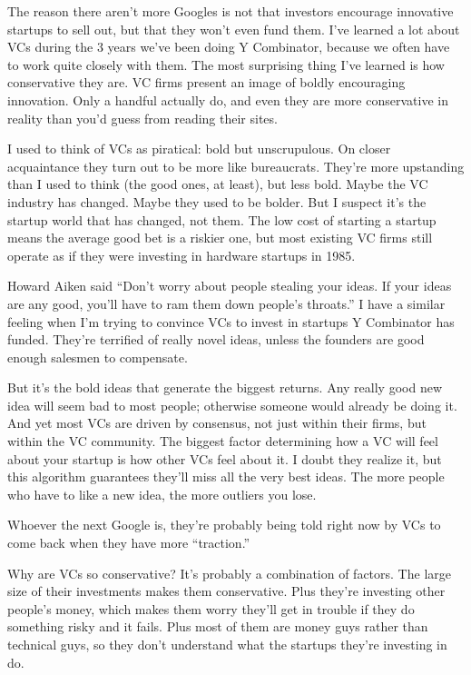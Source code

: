 The reason there aren't more Googles is not that investors encourage
innovative startups to sell out, but that they won't even fund them.
I've learned a lot about VCs during the 3 years we've been doing Y
Combinator, because we often have to work quite closely with them. The
most surprising thing I've learned is how conservative they are. VC
firms present an image of boldly encouraging innovation. Only a handful
actually do, and even they are more conservative in reality than you'd
guess from reading their sites.

I used to think of VCs as piratical: bold but unscrupulous. On closer
acquaintance they turn out to be more like bureaucrats. They're more
upstanding than I used to think (the good ones, at least), but less
bold. Maybe the VC industry has changed. Maybe they used to be bolder.
But I suspect it's the startup world that has changed, not them. The low
cost of starting a startup means the average good bet is a riskier one,
but most existing VC firms still operate as if they were investing in
hardware startups in 1985.

Howard Aiken said ``Don't worry about people stealing your ideas. If
your ideas are any good, you'll have to ram them down people's
throats.'' I have a similar feeling when I'm trying to convince VCs to
invest in startups Y Combinator has funded. They're terrified of really
novel ideas, unless the founders are good enough salesmen to compensate.

But it's the bold ideas that generate the biggest returns. Any really
good new idea will seem bad to most people; otherwise someone would
already be doing it. And yet most VCs are driven by consensus, not just
within their firms, but within the VC community. The biggest factor
determining how a VC will feel about your startup is how other VCs feel
about it. I doubt they realize it, but this algorithm guarantees they'll
miss all the very best ideas. The more people who have to like a new
idea, the more outliers you lose.

Whoever the next Google is, they're probably being told right now by VCs
to come back when they have more ``traction.''

Why are VCs so conservative? It's probably a combination of factors. The
large size of their investments makes them conservative. Plus they're
investing other people's money, which makes them worry they'll get in
trouble if they do something risky and it fails. Plus most of them are
money guys rather than technical guys, so they don't understand what the
startups they're investing in do.

